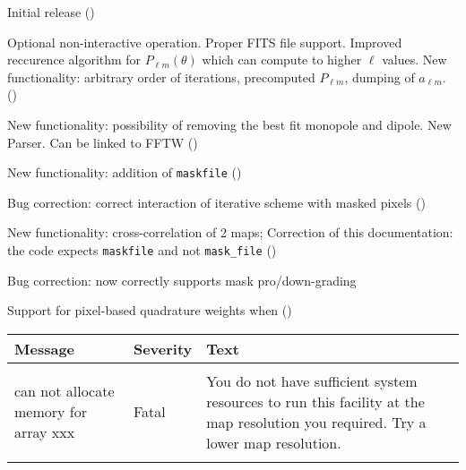 \begin{release}
  \begin{relist}
    \item Initial release ()
    \item Optional non-interactive operation. Proper FITS file
    support. Improved reccurence algorithm for $P_{\ell m}(\theta)$ which can compute to higher $\ell$ values. New functionality: arbitrary order of iterations, precomputed
    $P_{\ell m}$, dumping of $a_{\ell m}$. ()
    \item New functionality: possibility of removing the best fit monopole
    and dipole. New Parser. Can be linked to FFTW ()
    \item New functionality: addition of {\tt{maskfile}} ()
    \item Bug correction: correct interaction of iterative scheme with masked pixels ()
    \item New functionality: cross-correlation of 2 maps; Correction of this documentation: the code expects {\tt maskfile} and
not {\tt mask\_file}  ()
    \item Bug correction: now correctly supports mask pro/down-grading
    \item Support for pixel-based quadrature weights when  ()
  \end{relist}
\end{release}

\begin{messages}
{
\begin{tabular}{p{0.25\hsize} p{0.1\hsize} p{0.35\hsize}} \hline  
  \textbf{Message} & \textbf{Severity} & \textbf{Text} \\ \hline
                   &                   &   \\ %
can not allocate memory for array xxx &  Fatal & You do not have
                   sufficient system resources to run this
                   facility at the map resolution you required. 
  Try a lower map resolution.  \\ 
                   &                   &   \\ \hline %
\end{tabular}
} 
\end{messages}
%
\newpage
%
